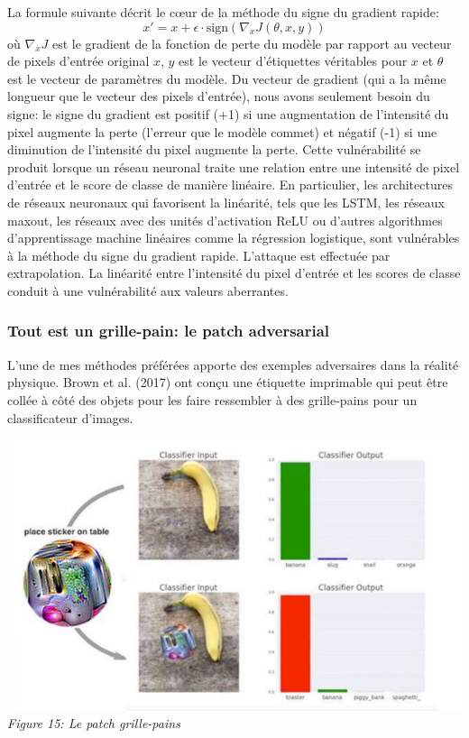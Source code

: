 La formule suivante décrit le cœur de la méthode du signe du gradient rapide:
\[
x' = x + \epsilon \cdot \text{sign}(\nabla_x J(\theta, x, y))
\]
où $\nabla_x J$ est le gradient de la fonction de perte du modèle par rapport au vecteur de pixels d'entrée original $x$, $y$ est le vecteur d'étiquettes véritables pour $x$ et $\theta$ est le vecteur de paramètres du modèle. Du vecteur de gradient (qui a la même longueur que le vecteur des pixels d'entrée), nous avons seulement besoin du signe: le signe du gradient est positif (+1) si une augmentation de l'intensité du pixel augmente la perte (l'erreur que le modèle commet) et négatif (-1) si une diminution de l'intensité du pixel augmente la perte. Cette vulnérabilité se produit lorsque un réseau neuronal traite une relation entre une intensité de pixel d'entrée et le score de classe de manière linéaire. En particulier, les architectures de réseaux neuronaux qui favorisent la linéarité, tels que les LSTM, les réseaux maxout, les réseaux avec des unités d'activation ReLU ou d'autres algorithmes d'apprentissage machine linéaires comme la régression logistique, sont vulnérables à la méthode du signe du gradient rapide. L'attaque est effectuée par extrapolation. La linéarité entre l'intensité du pixel d'entrée et les scores de classe conduit à une vulnérabilité aux valeurs aberrantes.

\subsubsection{Tout est un grille-pain: le patch adversarial}

L'une de mes méthodes préférées apporte des exemples adversaires dans la réalité physique. Brown et al. (2017) ont conçu une étiquette imprimable qui peut être collée à côté des objets pour les faire ressembler à des grille-pains pour un classificateur d'images.

\begin{center}
    \centering
    \includegraphics[width=0.7\linewidth]{Images/patch_grille_pain.png}
    \\
    \emph{Figure 15: Le patch grille-pains }
    \\
\end{center}
\\

